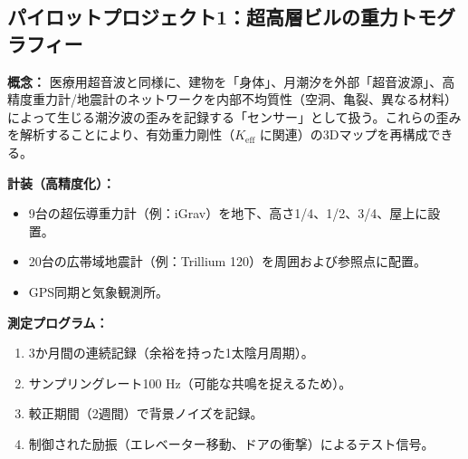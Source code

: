\documentclass[12pt,a4paper]{article}
\theoremstyle{remark}
\newcommand{\Keff}{K_{\mathrm{eff}}}
\begin{document}
	\subsection{パイロットプロジェクト1：超高層ビルの重力トモグラフィー}
	
	\textbf{概念：} 医療用超音波と同様に、建物を「身体」、月潮汐を外部「超音波源」、高精度重力計/地震計のネットワークを内部不均質性（空洞、亀裂、異なる材料）によって生じる潮汐波の歪みを記録する「センサー」として扱う。これらの歪みを解析することにより、有効重力剛性（\(\Keff\) に関連）の3Dマップを再構成できる。
	
	\textbf{計装（高精度化）：}
	\begin{itemize}
		\item 9台の超伝導重力計（例：iGrav）を地下、高さ1/4、1/2、3/4、屋上に設置。
		\item 20台の広帯域地震計（例：Trillium 120）を周囲および参照点に配置。
		\item GPS同期と気象観測所。
	\end{itemize}
	
	\textbf{測定プログラム：}
	\begin{enumerate}
		\item 3か月間の連続記録（余裕を持った1太陰月周期）。
		\item サンプリングレート100 Hz（可能な共鳴を捉えるため）。
		\item 較正期間（2週間）で背景ノイズを記録。
		\item 制御された励振（エレベーター移動、ドアの衝撃）によるテスト信号。
	\end{enumerate}
	
\end{document}
